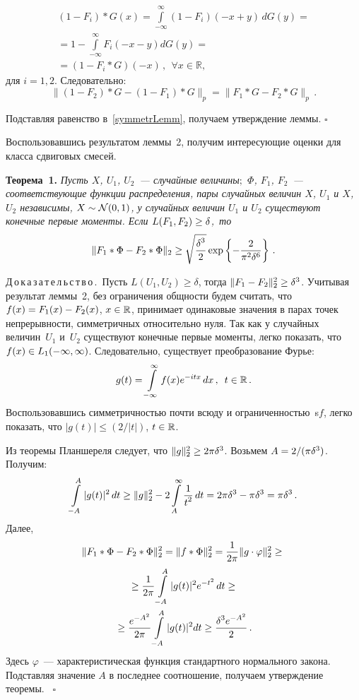 \begin{multicols}{2}
\noindent
\begin{multline*}
 (1-F_i) * G (x)  =
\int\limits_{-\infty}^{\infty} (1-F_i)(-x + y ) \,dG(y) =
{}\\
{}=
1-\int\limits_{-\infty}^{\infty}  F_i(-x - y )  d G(y) ={}\\
{}= (1-F_i  * G) ( - x)\,,\ \
  \forall x \in \mathbb{R},
\end{multline*}
для $i=1,2$. Следовательно:
$$\|
 (1-F_2) * G  - (1-F_1)*G
\|_{p} = \|
  F_1  * G  - F_2 * G
\|_{p}\,.
$$

\pagebreak

\noindent
Подставляя равенство в~\eqref{symmetrLemm}, получаем утверждение леммы. \hfill$\square$

Воспользовавшись результатом леммы~2, получим интересующие оценки
для класса сдвиговых смесей.  

\medskip

\noindent
\textbf{Теорема~1.}
\textit{Пусть $X$, $U_1$, $U_2$~--- случайные величины$;$ $\Phi$, $F_1$,
$F_2$~--- соответствующие функции распределения, пары случайных
величин $X$, $U_1$ и $X$, $U_2$  независимы,
$X \hm\sim \mathcal{N}(0,1)$, у случайных величин $U_1$ и $U_2$
существуют конечные первые моменты. Если $L(F_1,F_2) \hm\ge \delta$,~то}
$$
\|  F_1  * \Phi  - F_2 * \Phi \|_{2}\ge
\sqrt{\displaystyle\frac{\displaystyle  \delta^{3}\mathstrut}{\displaystyle 2\mathstrut}}
\exp\left\{-\frac{2}{\pi^2\delta^6}\right\}
\,.
$$

\noindent
Д\,о\,к\,а\,з\,а\,т\,е\,л\,ь\,с\,т\,в\,о\,.\ 
Пусть $L(U_1,U_2) \ge \delta$, тогда $\|  F_1  \hm-F_2
\|_{2}^2\ge\delta^3$. Учитывая результат леммы~2,
без ограничения общности будем считать, что $f( x )\hm= F_1 (x) \hm- F_2
(x)$, $x \hm\in \mathbb{R}$, принимает одинаковые значения в парах
точек непрерывности, симметричных относительно нуля. Так как у
случайных величин~$U_1$ и~$U_2$ существуют конечные первые моменты,
легко показать, что $f(x) \hm\in L_1(-\infty, \infty)$. Следовательно,
существует преобразование Фурье:
$$
g(t) = \int\limits_{-\infty}^{\infty}
f(x) e^{-i t x}\,dx\,,  \enskip t \in \mathbb{R}\,.
$$
Воспользовавшись симметричностью почти всюду и ограниченностью~s$f$,
легко показать, что $|g(t)|\le(2/|t|)$, $t \hm\in \mathbb{R}$.

Из теоремы Планшереля следует, что $ \|g \|^2_{2}\hm\ge 2\pi
\delta^3$. Возьмем $A \hm= {2}/({\pi\delta^3})$. Получим:
$$ 
\int\limits_{-A}^{A}
|g(t)|^2\, dt
\ge
\|g \|^2_{2} -
2 \int\limits_{A}^{\infty}\displaystyle\frac{\displaystyle 1\mathstrut}{\displaystyle t^2\mathstrut}\,dt
 =  2\pi \delta^3 -   \pi \delta^3 =   \pi \delta^3\,.
 $$
Далее,
\begin{multline*}
\|  F_1  * \Phi  - F_2 * \Phi \|_{2}^2 =
 \|  f * \Phi    \|_{2}^2 =
\displaystyle\frac{\displaystyle 1\mathstrut}{\displaystyle 2 \pi\mathstrut} \| g \cdot \varphi    \|_{2}^2 \ge
{}\\
{}
\ge\displaystyle\frac{\displaystyle 1\mathstrut}{\displaystyle 2 \pi\mathstrut}
\int\limits_{-A}^{A}|g(t)|^2 e^{-t^2}\,dt
\ge {}\\
{}\ge\displaystyle\frac{\displaystyle e^{-A^2}\mathstrut}{\displaystyle 2 \pi\mathstrut}
\int\limits_{-A}^{A}
|g(t)|^2  dt \ge \displaystyle\frac{\displaystyle  \delta^3e^{-A^2}\mathstrut}{\displaystyle 2\mathstrut}\,.
\end{multline*}
Здесь $\varphi$~--- характеристическая функция стандартного
нормального закона. Подставляя значение $A$ в последнее соотношение,
получаем утверждение теоремы. \hfill~$\square$


\end{multicols}
